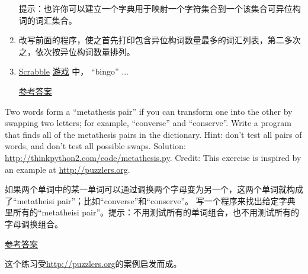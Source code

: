 \begin{exercise}
\begin{enumerate}
提示：也许你可以建立一个字典用于映射一个字符集合到一个该集合可异位构词的词汇集合。

\item 改写前面的程序，使之首先打印包含异位构词数量最多的词汇列表，第二多次之，依次按异位构词数量排列。

\item \href{https://en.wikipedia.org/wiki/Scrabble}{Scrabble} \href{https://zh.wikipedia.org/wiki/Scrabble}{游戏} 中， “bingo” ...

\href{http://thinkpython2.com/code/anagram_sets.py}{参考答案}

\end{enumerate}

\end{exercise}

\begin{exercise}

Two words form a ``metathesis pair'' if you can transform one into the
other by swapping two letters; for example, ``converse'' and
``conserve''.  Write a program that finds all of the metathesis pairs
in the dictionary.  Hint: don't test all pairs of words, and don't
test all possible swaps.  Solution:
\url{http://thinkpython2.com/code/metathesis.py}.  Credit: This
exercise is inspired by an example at \url{http://puzzlers.org}.

如果两个单词中的某一单词可以通过调换两个字母变为另一个，这两个单词就构成了``metatheisi pair''；比如``converse''和``conserve''。 写一个程序来找出给定字典里所有的``metatheisi pair''。提示：不用测试所有的单词组合，也不用测试所有的字母调换组合。

\href{http://thinkpython2.com/code/metathesis.py}{参考答案}

这个练习受\href{http://puzzlers.org}{http://puzzlers.org}的案例启发而成。

\end{exercise}


